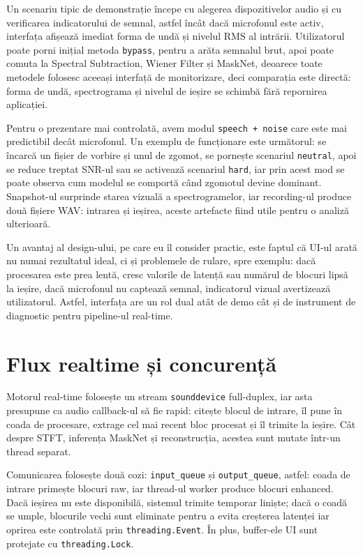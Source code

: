 \documentclass[12pt,a4paper]{report}
\begin{document}
Un scenariu tipic de demonstrație începe cu alegerea dispozitivelor 
audio și cu verificarea indicatorului de semnal, astfel încât dacă 
microfonul este activ, interfața afișează imediat forma de undă și 
nivelul RMS al intrării. Utilizatorul poate porni inițial metoda 
\texttt{bypass}, pentru a arăta semnalul brut, apoi poate comuta la Spectral 
Subtraction, Wiener Filter și MaskNet, deoarece toate metodele 
folosesc aceeași interfață de monitorizare, deci comparația este 
directă: forma de undă, spectrograma și nivelul de ieșire se schimbă 
fără repornirea aplicației.

Pentru o prezentare mai controlată, avem modul \texttt{speech + noise} care este 
mai predictibil decât microfonul. Un exemplu de funcționare este 
următorul: se încarcă un fișier de vorbire și unul de zgomot, se 
pornește scenariul \texttt{neutral}, apoi se reduce treptat SNR-ul sau se 
activează scenariul \texttt{hard}, iar prin acest mod se poate observa cum 
modelul se comportă când zgomotul devine dominant. Snapshot-ul 
surprinde starea vizuală a spectrogramelor, iar recording-ul produce 
două fișiere WAV: intrarea și ieșirea, aceste artefacte fiind utile 
pentru o analiză ulterioară.

Un avantaj al design-ului, pe care eu îl consider practic, este faptul 
că UI-ul arată nu numai rezultatul ideal, ci și problemele de rulare, 
spre exemplu: dacă procesarea este prea lentă, cresc valorile de 
latență sau numărul de blocuri lipsă la ieșire, dacă microfonul nu 
captează semnal, indicatorul vizual avertizează utilizatorul. Astfel, 
interfața are un rol dual atât de demo cât și de instrument de 
diagnostic pentru pipeline-ul real-time.

\section{Flux realtime și concurență}

Motorul real-time folosește un stream \texttt{sounddevice} full-duplex, iar 
asta presupune ca audio callback-ul să fie rapid: citește blocul de 
intrare, îl pune în coada de procesare, extrage cel mai recent bloc 
procesat și îl trimite la ieșire. Cât despre STFT, inferența MaskNet 
și reconstrucția, acestea sunt mutate într-un thread separat.

Comunicarea folosește două cozi: \texttt{input\_queue} și \texttt{output\_queue}, astfel: 
coada de intrare primește blocuri raw, iar thread-ul worker produce 
blocuri enhanced. Dacă ieșirea nu este disponibilă, sistemul trimite 
temporar liniște; dacă o coadă se umple, blocurile vechi sunt 
eliminate pentru a evita creșterea latenței iar oprirea este 
controlată prin \texttt{threading.Event}. În plus, buffer-ele UI sunt protejate 
cu \texttt{threading.Lock}.
\end{document}
